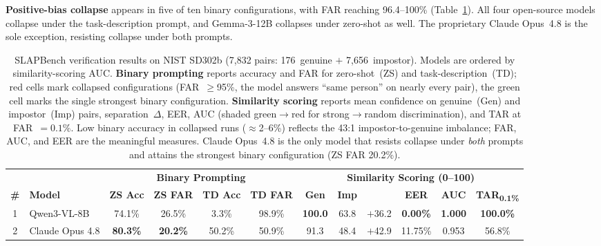 \documentclass[runningheads]{llncs}
\begin{document}
\textbf{Positive-bias collapse} appears in five of ten binary
configurations, with FAR reaching 96.4--100\%
(Table~\ref{tab:main_results}). All four open-source models collapse under
the task-description prompt, and Gemma-3-12B collapses under zero-shot as
well. The proprietary Claude Opus~4.8 is the sole exception, resisting
collapse under both prompts.

\begin{table}[t]
\centering
\caption{SLAPBench verification results on NIST SD302b (7,832 pairs:
  176~genuine $+$ 7,656~impostor). Models are ordered by similarity-scoring
  AUC. \textbf{Binary prompting} reports accuracy and FAR for zero-shot~(ZS)
  and task-description~(TD); red cells mark collapsed configurations
  (FAR~$\geq$95\%, the model answers ``same person'' on nearly every pair),
  the green cell marks the single strongest binary configuration.
  \textbf{Similarity scoring} reports mean confidence on genuine~(Gen) and
  impostor~(Imp) pairs, separation~$\Delta$, EER, AUC (shaded green$\rightarrow$red
  for strong$\rightarrow$random discrimination), and TAR at FAR~$=0.1\%$.
  Low binary accuracy in collapsed runs ($\approx$2--6\%) reflects the
  43:1 impostor-to-genuine imbalance; FAR, AUC, and EER are the meaningful
  measures. Claude Opus~4.8 is the only model that resists collapse under
  \emph{both} prompts and attains the strongest binary configuration
  (ZS FAR 20.2\%).}
\label{tab:main_results}
\renewcommand{\arraystretch}{1.25}
\setlength{\tabcolsep}{4.5pt}
\footnotesize
\begin{tabular}{c l cccc cccccc}
\toprule
& & \multicolumn{4}{c}{\cellcolor{grpBin}\textbf{Binary Prompting}}
  & \multicolumn{6}{c}{\cellcolor{grpScore}\textbf{Similarity Scoring (0--100)}} \\
\cmidrule(lr){3-6}\cmidrule(lr){7-12}
\textbf{\#} & \textbf{Model}
  & \textbf{ZS Acc} & \textbf{ZS FAR} & \textbf{TD Acc} & \textbf{TD FAR}
  & \textbf{Gen} & \textbf{Imp} & \boldmath{$\Delta$} & \textbf{EER}
  & \textbf{AUC} & \textbf{TAR\textsubscript{0.1\%}} \\
\midrule
1 & Qwen3-VL-8B
  & 74.1\% & 26.5\% & 3.3\% & \cellcolor{collapseRed}98.9\%
  & \textbf{100.0} & 63.8 & $+$36.2 & \textbf{0.00\%}
  & \cellcolor{aucPerfect}\textbf{1.000} & \textbf{100.0\%} \\
2 & Claude Opus 4.8
  & \textbf{80.3\%} & \cellcolor{funcGreen}\textbf{20.2\%} & 50.2\% & 50.9\%
  & 91.3 & 48.4 & $+$42.9 & 11.75\%
  & \cellcolor{aucStrong}0.953 & 56.8\% \\

\end{tabular}
\end{table}
\end{document}
